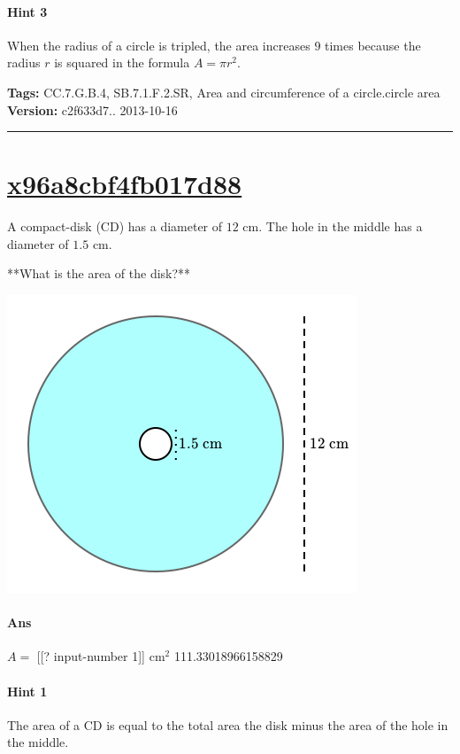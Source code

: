 \documentclass[twocolumn,10pt]{article}
\def\shrinkfactor{0.45}
\begin{document}
\paragraph{Hint 3}When the radius of a circle is tripled, the area increases $9$ times because the radius $r$ is squared in the formula $A=\pi r^2$. 



\medskip
\noindent
\textbf{Tags:} {\footnotesize CC.7.G.B.4, SB.7.1.F.2.SR, Area and circumference of a circle.circle area}\\
\textbf{Version:} c2f633d7.. 2013-10-16
\smallskip\hrule





\section{\href{https://www.khanacademy.org/devadmin/content/items/x96a8cbf4fb017d88}{x96a8cbf4fb017d88}}

\noindent
A compact-disk (CD) has a diameter of $12\text{ cm}$. The hole in the middle has a diameter of $1.5\text{ cm}$. 

**What is the area of the disk?**  


\includegraphics[scale=\shrinkfactor]{figures/fea5db7586f0e819785c674bb2fc6212dda1ce88.png}

\paragraph{Ans} $A =$ [[? input-number 1]] $\text{cm}^2$  111.33018966158829

\paragraph{Hint 1}The area of a CD is equal to the total area the disk minus the area of the hole in the middle.
\end{document}

